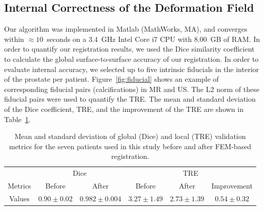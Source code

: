 \documentclass[runningheads,a4paper]{llncs}
\begin{document}
\subsection{Internal Correctness of the Deformation Field}\label{sec:internal}
Our algorithm was implemented in Matlab (MathWorks, MA), and converges within $\approx10$~seconds on a $3.4$~GHz Intel Core i7 CPU with $8.00$~GB of RAM. In order to quantify our registration results, we used the Dice similarity coefficient to calculate the global surface-to-surface accuracy of our registration. In order to evaluate internal accuracy, we selected up to five intrinsic fiducials in the interior of the prostate per patient. Figure~\ref{fig:fiducial} shows an example of corresponding fiducial pairs (calcifications) in MR and US. The L2 norm of these fiducial pairs were used to quantify the TRE. The mean and standard deviation of the Dice coefficient, TRE, and the improvement of the TRE are shown in Table~\ref{tab:Res1}.
\begin{table}[tb]
\begin{center}
\caption{Mean and standard deviation of global (Dice) and local (TRE) validation metrics for the seven patients used in this study before and after FEM-based registration.}
\centering
\begin{tabular}{c| c| c| c| c| c|}
	\hline
  & \multicolumn{2}{|c|}{Dice} & \multicolumn{3}{|c|}{TRE} \\
	\cline{2-3}  \cline{4-6} 
	Metrics & Before & After & Before & After & Improvement\\
	\hline
	Values & $0.90\pm 0.02$ & $0.982 \pm 0.004$ & $3.27 \pm 1.49$ & $2.73 \pm 1.39$ & $0.54 \pm 0.32$ \\
   \hline
\end{tabular}
\label{tab:Res1}
\end{center}
\end{table}
\end{document}
